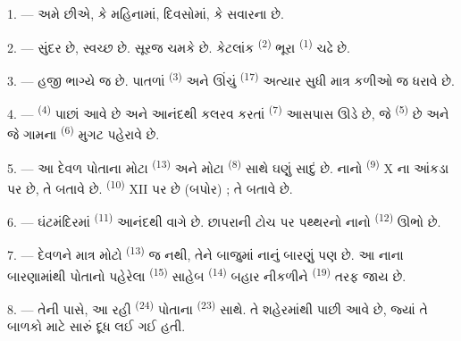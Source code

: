 \VUsaut{2.4mm}

\VUsaut{3.0mm}

1. --- અમે  છીએ,   કે
 મહિનામાં,  દિવસોમાં,
  કે  સવારના
 છે.

2. ---  સુંદર છે,  સ્વચ્છ છે. સૂરજ
ચમકે છે. કેટલાંક  \textsuperscript{(2)} ભૂરા
 \textsuperscript{(1)} ચઢે છે.

3. ---  હજી ભાગ્યે જ  છે. પાતળાં
 \textsuperscript{(3)} અને ઊંચું 
\textsuperscript{(17)} અત્યાર સુધી માત્ર કળીઓ જ ધરાવે છે.

4. ---  \textsuperscript{(4)} પાછાં આવે છે અને
આનંદથી કલરવ કરતાં  \textsuperscript{(7)} આસપાસ ઊડે છે,
જે  \textsuperscript{(5)} છે અને જે ગામના
 \textsuperscript{(6)} મુગટ પહેરાવે છે.

\VUsaut{3.4mm}
\VUsaut{3.0mm}

5. --- આ દેવળ પોતાના મોટા  \textsuperscript{(13)} અને
મોટા  \textsuperscript{(8)} સાથે ઘણું સાદું છે. નાનો
 \textsuperscript{(9)} X ના આંકડા પર છે, તે
 બતાવે છે.  \textsuperscript{(10)} XII પર છે
(બપોર) ; તે  બતાવે છે.

6. --- ઘંટમંદિરમાં  \textsuperscript{(11)} આનંદથી વાગે છે.
છાપરાની ટોચ પર પથ્થરનો નાનો  \textsuperscript{(12)} ઊભો
છે.

7. --- દેવળને માત્ર મોટો  \textsuperscript{(13)} જ નથી,
તેને બાજુમાં નાનું બારણું પણ છે. આ નાના બારણામાંથી પોતાનો
 પહેરેલા  \textsuperscript{(15)} સાહેબ
 \textsuperscript{(14)} બહાર નીકળીને
 \textsuperscript{(19)} તરફ જાય છે.

8. --- તેની પાસે, આ રહી 
\textsuperscript{(24)} પોતાના  \textsuperscript{(23)} સાથે.
તે શહેરમાંથી પાછી આવે છે, જ્યાં તે બાળકો માટે સારું દૂધ લઈ ગઈ હતી.

\VUsaut{4.0mm}
\VUsaut{3.4mm}

